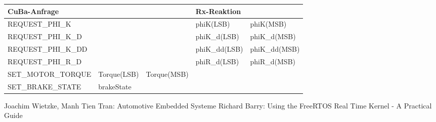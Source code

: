 \documentclass{article}
\begin{document}
\begin{table}[h]
\centering
\label{my-label}
\begin{tabular}{|l|l|l|l|l|}
\hline
\textbf{CuBa-Anfrage} & \textbf{}   & \textbf{}   & \textbf{Rx-Reaktion} &               \\ \hline
REQUEST\_PHI\_K       &             &             & phiK(LSB)            & phiK(MSB)     \\ \hline
REQUEST\_PHI\_K\_D    &             &             & phiK\_d(LSB)         & phiK\_d(MSB)  \\ \hline
REQUEST\_PHI\_K\_DD   &             &             & phiK\_dd(LSB)        & phiK\_dd(MSB) \\ \hline
REQUEST\_PHI\_R\_D    &             &             & phiR\_d(LSB)         &  phiR\_d(MSB) \\ \hline
SET\_MOTOR\_TORQUE    & Torque(LSB) & Torque(MSB) &                      &               \\ \hline
SET\_BRAKE\_STATE     & brakeState  &             &                      &               \\ \hline
\end{tabular}
\end{table}

\newpage
\begin{thebibliography}{\hspace{0.5cm}}
	 Joachim Wietzke, Manh Tien Tran: Automotive Embedded Systeme
	 Richard Barry: Using the FreeRTOS Real Time Kernel - A Practical Guide
\end{thebibliography}
\end{document}
